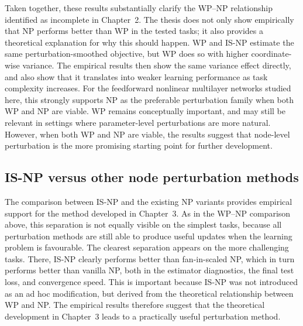Taken together, these results substantially clarify the WP--NP relationship identified as incomplete in Chapter~2. The thesis does not only show empirically that NP performs better than WP in the tested tasks; it also provides a theoretical explanation for why this should happen. WP and IS-NP estimate the same perturbation-smoothed objective, but WP does so with higher coordinate-wise variance. The empirical results then show the same variance effect directly, and also show that it translates into weaker learning performance as task complexity increases. For the feedforward nonlinear multilayer networks studied here, this strongly supports NP as the preferable perturbation family when both WP and NP are viable. WP remains conceptually important, and may still be relevant in settings where parameter-level perturbations are more natural. However, when both WP and NP are viable, the results suggest that node-level perturbation is the more promising starting point for further development.

\subsection{IS-NP versus other node perturbation methods}

The comparison between IS-NP and the existing NP variants provides empirical support for the method developed in Chapter~3. As in the WP--NP comparison above, this separation is not equally visible on the simplest tasks, because all perturbation methods are still able to produce useful updates when the learning problem is favourable. The clearest separation appears on the more challenging tasks. There, IS-NP clearly performs better than fan-in-scaled NP, which in turn performs better than vanilla NP, both in the estimator diagnostics, the final test loss, and convergence speed. This is important because IS-NP was not introduced as an ad hoc modification, but derived from the theoretical relationship between WP and NP. The empirical results therefore suggest that the theoretical development in Chapter~3 leads to a practically useful perturbation method.

